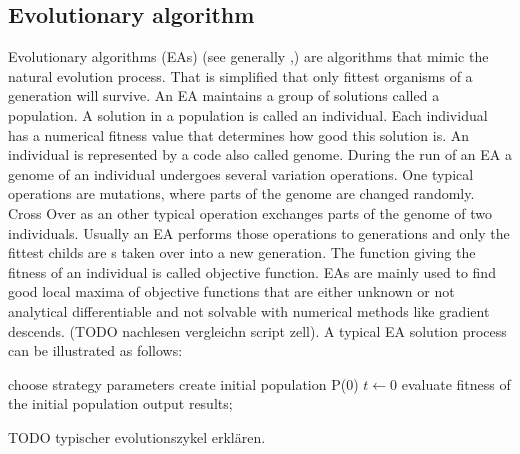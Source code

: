 \subsection{Evolutionary algorithm} %
Evolutionary algorithms (EAs) (see generally \cite{book:IntroductionEA},\cite{book:IntroductionEA}) are algorithms that mimic the natural evolution process. That is simplified that only fittest organisms of a generation will survive. An EA maintains a group of solutions called a population. A solution in a population is called an individual. Each individual has a numerical fitness value that determines how good this solution is. An individual is represented by a code also called genome. During the run of an EA a genome of an individual undergoes several variation operations. One typical operations are mutations, where parts of the genome are changed randomly. Cross Over as an other typical operation exchanges parts of the genome of two individuals. Usually an EA performs those operations to generations and only the fittest childs are s taken over into a new generation. The function giving the fitness of an individual is called objective function. EAs are mainly used to find good local maxima of objective functions that are either unknown or not analytical differentiable and not solvable with numerical methods like gradient descends.  (TODO nachlesen vergleichn script zell). A  typical EA solution process can be illustrated as follows:
\begin{algorithm}[h!] %
	choose strategy parameters\;
	create initial population P(0)\;
	$t \gets 0$\;
	evaluate fitness of the initial population\;
 	output results;
 	
\end{algorithm}
TODO typischer evolutionszykel erklären.


